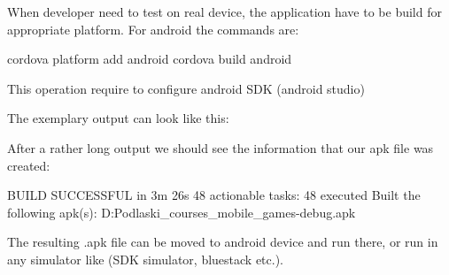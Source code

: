When developer need to test on real device, the application have to be build for appropriate platform. For android the commands are:

\begin{shell}
cordova platform add android
cordova build android
\end{shell}

\begin{remark}
This operation require to configure android SDK (android studio)
\end{remark}

The exemplary output can look like this:

After a rather long output we should see the information that our apk file was created:
\begin{shelloutput}
BUILD SUCCESSFUL in 3m 26s 
48 actionable tasks: 48 executed
Built the following apk(s): D:\Users\Krzysztof Podlaski\Documents\Uniwerek\GENIUS\didactic_courses\Cordova_mobile_games\code\UIExamples\platforms\android\app\build\outputs\apk\debug\app-debug.apk
\end{shelloutput}

The resulting .apk file can be moved to android device and run there, or run in any simulator like (SDK simulator, bluestack etc.).




